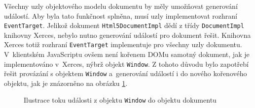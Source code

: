 Všechny uzly objektového modelu dokumentu by měly umožňovat generování událostí. Aby byla tato funkčnost splněna, musí uzly implementovat rozhraní \texttt{EventTarget}. Jelikož dokument \texttt{Html5DocumentImpl} dědí z třídy \texttt{DocumentImpl} knihovny Xerces, nebylo nutno generování událostí pro dokument řešit. Knihovna Xerces totiž rozhraní \texttt{EventTarget} implementuje pro všechny uzly dokumentu. V~klientském JavaScriptu ovšem není kořenem DOMu samotný dokument, jak je implementováno v~Xerces, nýbrž objekt \texttt{Window}. Z tohoto důvodu bylo zapotřebí řešit provázání s objektem \texttt{Window} a~generování událostí i do nového kořenového objektu, jak je znázorněno na obrázku \ref{Figure.EventWindowDocument}. 

\begin{figure}[H]
  \begin{center}
    \caption{Ilustrace toku události z objektu \texttt{Window} do objektu dokumentu}
    \label{Figure.EventWindowDocument}
  \end{center}
\end{figure}

